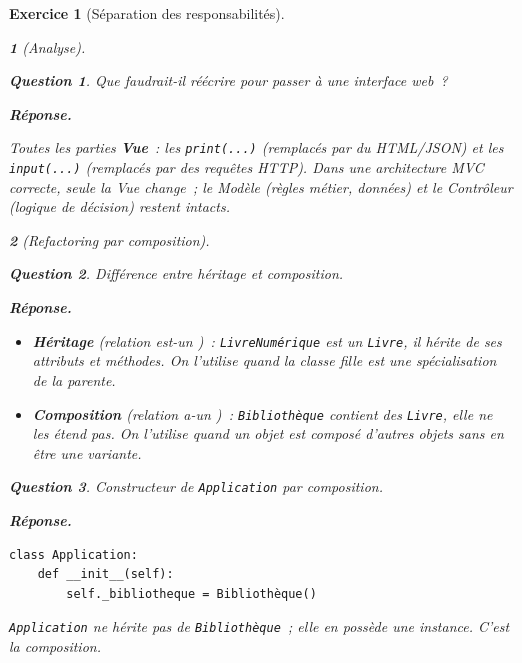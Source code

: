 \documentclass{article}
\theoremstyle{exostyle}
\newtheorem{exo}{Exercice}
\theoremstyle{partiestyle}
\newtheorem{partie}{}[exo]
\theoremstyle{questionstyle}
\newtheorem{questionpartie}{Question}[partie]
\newenvironment{reponse}{%
    \par\smallskip\noindent\textbf{Réponse.}\enspace\ignorespaces
}{%
    \par\smallskip
}
\begin{document}
\begin{exo}[Séparation des responsabilités]
\begin{partie}[Analyse]
        \begin{questionpartie}
            Que faudrait-il réécrire pour passer à une interface web~?
        \end{questionpartie}
        \begin{reponse}
            Toutes les parties \textbf{Vue}~: les \texttt{print(...)} (remplacés par du HTML/JSON) et les \texttt{input(...)} (remplacés par des requêtes HTTP). Dans une architecture MVC correcte, seule la Vue change~; le Modèle (règles métier, données) et le Contrôleur (logique de décision) restent intacts.
        \end{reponse}

    \end{partie}

    \begin{partie}[Refactoring par composition]

        \begin{questionpartie}
            Différence entre héritage et composition.
        \end{questionpartie}
        \begin{reponse}
            \begin{itemize}
                \item \textbf{Héritage} (relation \og est-un \fg{})~: \texttt{LivreNumérique} est un \texttt{Livre}, il hérite de ses attributs et méthodes. On l'utilise quand la classe fille est une spécialisation de la parente.
                \item \textbf{Composition} (relation \og a-un \fg{})~: \texttt{Bibliothèque} contient des \texttt{Livre}, elle ne les étend pas. On l'utilise quand un objet est composé d'autres objets sans en être une variante.
            \end{itemize}
        \end{reponse}

        \begin{questionpartie}
            Constructeur de \texttt{Application} par composition.
        \end{questionpartie}
        \begin{reponse}
\begin{lstlisting}
class Application:
    def __init__(self):
        self._bibliotheque = Bibliothèque()
\end{lstlisting}
            \texttt{Application} ne hérite pas de \texttt{Bibliothèque}~; elle en \textit{possède} une instance. C'est la composition.
        \end{reponse}


\end{partie}
\end{exo}
\end{document}
